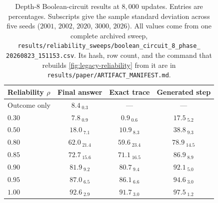 \begin{table}[htbp]
\centering
\small
\begin{tabular}{lccc}
\toprule
Reliability $\rho$ & Final answer & Exact trace & Generated step\\
\midrule
Outcome only & $8.4_{\;\text{0.3}}$ & --- & --- \\
$0.30$ & $7.8_{\;\text{0.9}}$ & $0.9_{\;\text{0.6}}$ & $17.5_{\;\text{5.2}}$ \\
$0.50$ & $18.0_{\;\text{7.1}}$ & $10.9_{\;\text{8.3}}$ & $38.8_{\;\text{9.3}}$ \\
$0.80$ & $62.0_{\;\text{21.4}}$ & $59.6_{\;\text{23.4}}$ & $78.9_{\;\text{14.5}}$ \\
$0.85$ & $72.7_{\;\text{15.6}}$ & $71.1_{\;\text{16.5}}$ & $86.9_{\;\text{8.9}}$ \\
$0.90$ & $81.9_{\;\text{9.2}}$ & $80.7_{\;\text{9.4}}$ & $92.1_{\;\text{5.0}}$ \\
$0.95$ & $87.0_{\;\text{6.5}}$ & $86.1_{\;\text{6.6}}$ & $94.6_{\;\text{3.0}}$ \\
$1.00$ & $92.6_{\;\text{2.9}}$ & $91.7_{\;\text{3.0}}$ & $97.5_{\;\text{1.2}}$ \\
\bottomrule
\end{tabular}
\caption{Depth-8 Boolean-circuit results at $8{,}000$ updates.  Entries are
percentages. Subscripts give the sample standard deviation across five
seeds ($2001$, $2002$, $2020$, $3000$, $2026$). All values come from one complete archived
sweep, \texttt{results/reliability\_sweeps/boolean\_circuit\_8\_phase\_}
\texttt{20260823\_151153.csv}. Its hash, row count, and the command that
rebuilds \cref{fig:legacy-reliability} from it are in
\texttt{results/paper/ARTIFACT\_MANIFEST.md}.}
\label{tab:legacy-circuit}
\end{table}

